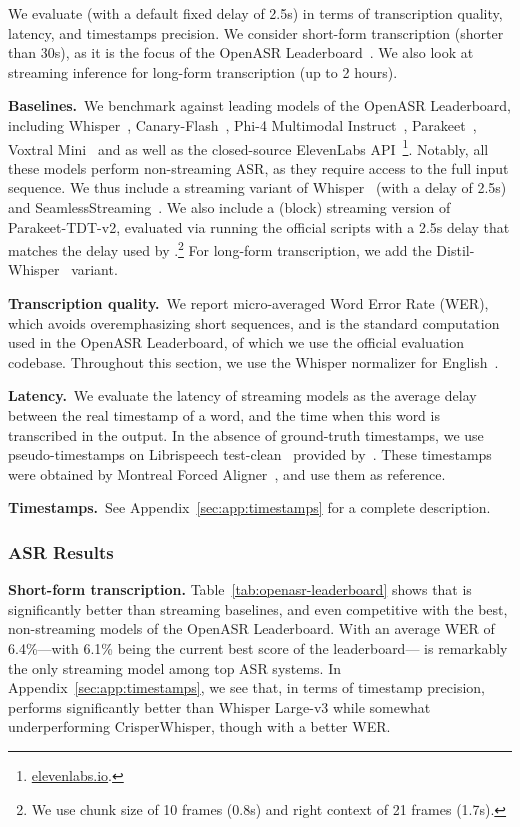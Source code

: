 \documentclass{article}
\begin{document}
We evaluate \oursASR{} (with a default fixed delay of 2.5s) in terms of transcription quality, latency, and timestamps precision. We consider short-form transcription (shorter than 30s), as it is the focus of the OpenASR Leaderboard~\citep{open-asr-leaderboard}. We also look at streaming inference for long-form transcription (up to 2 hours).

\textbf{Baselines.}\ 
We benchmark \oursASR{} against leading models of the OpenASR Leaderboard, including Whisper~\citep{whisper}, 
Canary-Flash~\citep{canary}, Phi-4 Multimodal Instruct~\citep{phi4}, Parakeet~\citep{parakeet}, Voxtral Mini~\citep{voxtral} and as well as the closed-source ElevenLabs API~\footnote{\href{https://elevenlabs.io/}{elevenlabs.io}.}. Notably, all these models perform non-streaming ASR, as they require access to the full input sequence. We thus include a streaming variant of Whisper~\citep{whisper-streaming} (with a delay of 2.5s) and SeamlessStreaming~\citep{seamless}. We also include a (block) streaming version of Parakeet-TDT-v2, evaluated via running the official scripts 
with a 2.5s delay that matches the delay used by \oursASR{}.\footnote{We use chunk size of 10 frames (0.8s) and right context of 21 frames (1.7s).} 
For long-form transcription, we add the Distil-Whisper~\citep{distil-whisper} variant.

\textbf{Transcription quality.}\ We report micro-averaged Word Error Rate (WER), which %
avoids overemphasizing short sequences, and is the standard computation used in the OpenASR Leaderboard, of which we use the official evaluation codebase. %
Throughout this section, we use the Whisper normalizer for English~\citep{whisper}.

\textbf{Latency.}\ We evaluate the latency of streaming models as the average delay between the real timestamp of a word, and the time when this word is transcribed in the output. In the absence of ground-truth timestamps, we use pseudo-timestamps on Librispeech test-clean~\citep{librispeech} provided by~\cite{lugosch2019}. These timestamps were obtained by Montreal Forced Aligner~\citep{montreal_forced_aligner}, and use them as reference.%

\textbf{Timestamps.}\ See Appendix~\ref{sec:app:timestamps} for a complete description. 

\subsubsection{ASR Results}\label{sec:dsm_asr_results}
\textbf{Short-form transcription.}
Table~\ref{tab:openasr-leaderboard} shows that \oursASR{} is significantly better than streaming baselines, and even competitive with the best, non-streaming models of the OpenASR Leaderboard. With an average WER of 6.4\%---with 6.1\% being the current best score of the leaderboard---\oursASR{} is remarkably the only streaming model among top ASR systems. In Appendix~\ref{sec:app:timestamps}, we see that, in terms of timestamp precision, \oursASR{} performs significantly better than Whisper Large-v3 while somewhat underperforming CrisperWhisper, though with a better WER. 
\end{document}
